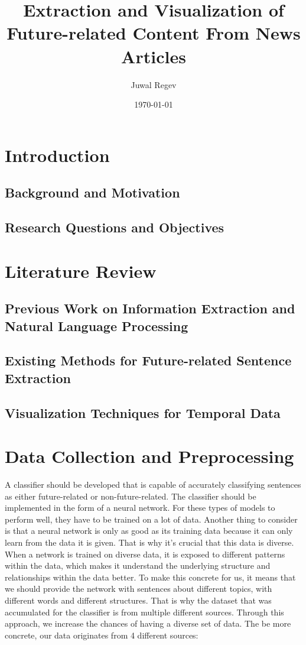 \documentclass[a4paper,12pt]{report} %
\title{Extraction and Visualization of Future-related Content From News Articles}
\author{Juwal Regev}
\date{\today} %
\begin{document}
\maketitle

\begin{abstract}
\end{abstract}

\tableofcontents

\chapter{Introduction}
\section{Background and Motivation}
\section{Research Questions and Objectives}

\chapter{Literature Review}
\section{Previous Work on Information Extraction and Natural Language Processing}
\section{Existing Methods for Future-related Sentence Extraction}
\section{Visualization Techniques for Temporal Data}

\chapter{Data Collection and Preprocessing}
A classifier should be developed that is capable of accurately classifying sentences as either future-related or non-future-related. The classifier should be implemented in the form of a neural network. For these types of models to perform well, they have to be trained on a lot of data. Another thing to consider is that a neural network is only as good as its training data because it can only learn from the data it is given. That is why it's crucial that this data is diverse. When a network is trained on diverse data, it is exposed to different patterns within the data, which makes it understand the underlying structure and relationships within the data better. To make this concrete for us, it means that we should provide the network with sentences about different topics, with different words and different structures. That is why the dataset that was accumulated for the classifier is from multiple different sources. Through this approach, we increase the chances of having a diverse set of data.     
The be more concrete, our data originates from 4 different sources:
\end{document}
